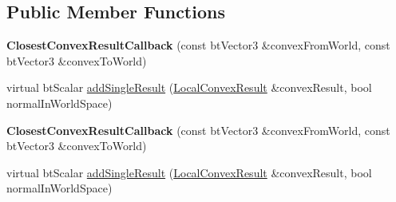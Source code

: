 \subsection*{Public Member Functions}
\begin{DoxyCompactItemize}
\item 
\mbox{\label{structbtCollisionWorld_1_1ClosestConvexResultCallback_aa3a9614ed8e472585105296eff35ed15}} 
{\bfseries Closest\+Convex\+Result\+Callback} (const bt\+Vector3 \&convex\+From\+World, const bt\+Vector3 \&convex\+To\+World)
\item 
virtual bt\+Scalar \hyperlink{structbtCollisionWorld_1_1ClosestConvexResultCallback_a9dee5c09f1bb54f868f34a28353b4505}{add\+Single\+Result} (\hyperlink{structbtCollisionWorld_1_1LocalConvexResult}{Local\+Convex\+Result} \&convex\+Result, bool normal\+In\+World\+Space)
\item 
\mbox{\label{structbtCollisionWorld_1_1ClosestConvexResultCallback_aa3a9614ed8e472585105296eff35ed15}} 
{\bfseries Closest\+Convex\+Result\+Callback} (const bt\+Vector3 \&convex\+From\+World, const bt\+Vector3 \&convex\+To\+World)
\item 
virtual bt\+Scalar \hyperlink{structbtCollisionWorld_1_1ClosestConvexResultCallback_a9dee5c09f1bb54f868f34a28353b4505}{add\+Single\+Result} (\hyperlink{structbtCollisionWorld_1_1LocalConvexResult}{Local\+Convex\+Result} \&convex\+Result, bool normal\+In\+World\+Space)
\end{DoxyCompactItemize}
